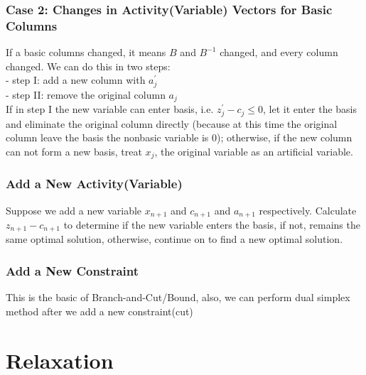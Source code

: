 				\subsubsection{Case 2: Changes in Activity(Variable) Vectors for Basic Columns}
					If a basic columns changed, it means $B$ and $B^{-1}$ changed, and every column changed. We can do this in two steps:\\
					- step I: add a new column with $a_j^{'}$\\
					- step II: remove the original column $a_j$\\
					If in step I the new variable can enter basis, i.e. $z_j^{'} - c_j \le 0$, let it enter the basis and eliminate the original column directly (because at this time the original column leave the basis the nonbasic variable is 0); otherwise, if the new column can not form a new basis, treat $x_j$, the original variable as an artificial variable.

				\subsubsection{Add a New Activity(Variable)}
					Suppose we add a new variable $x_{n+1}$ and $c_{n+1}$ and $a_{n+1}$ respectively. Calculate $z_{n+1} - c_{n+1}$ to determine if the new variable enters the basis, if not, remains the same optimal solution, otherwise, continue on to find a new optimal solution.

				\subsubsection{Add a New Constraint}
					This is the basic of Branch-and-Cut/Bound, also, we can perform dual simplex method after we add a new constraint(cut)\\
				
		\section{Relaxation}
